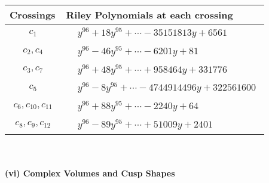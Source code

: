 \documentclass[1p]{elsarticle_modified}
\theoremstyle{definition}
\begin{document}
\begin{tabular}{m{50pt}|m{274pt}}
Crossings & \hspace{64pt}Riley Polynomials at each crossing \\
\hline $$\begin{aligned}c_{1}\end{aligned}$$&$\begin{aligned}
&y^{96}+18 y^{95}+\cdots-35151813 y+6561
\end{aligned}$\\
\hline $$\begin{aligned}c_{2},c_{4}\end{aligned}$$&$\begin{aligned}
&y^{96}-46 y^{95}+\cdots-6201 y+81
\end{aligned}$\\
\hline $$\begin{aligned}c_{3},c_{7}\end{aligned}$$&$\begin{aligned}
&y^{96}+48 y^{95}+\cdots+958464 y+331776
\end{aligned}$\\
\hline $$\begin{aligned}c_{5}\end{aligned}$$&$\begin{aligned}
&y^{96}-8 y^{95}+\cdots-4744914496 y+322561600
\end{aligned}$\\
\hline $$\begin{aligned}c_{6},c_{10},c_{11}\end{aligned}$$&$\begin{aligned}
&y^{96}+88 y^{95}+\cdots-2240 y+64
\end{aligned}$\\
\hline $$\begin{aligned}c_{8},c_{9},c_{12}\end{aligned}$$&$\begin{aligned}
&y^{96}-89 y^{95}+\cdots+51009 y+2401
\end{aligned}$\\
\hline
\end{tabular}\\~\\
\newpage\flushleft \textbf{(vi) Complex Volumes and Cusp Shapes}
\end{document}
